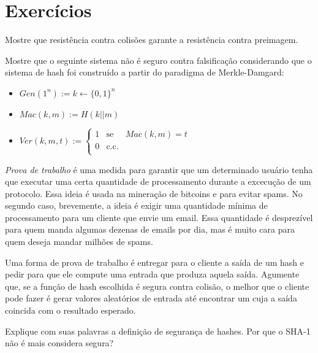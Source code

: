 \section{Exercícios}
\label{sec:exercicios}

\begin{exercicio}
  Mostre que resistência contra colisões garante a resistência contra preimagem.
\end{exercicio}

\begin{exercicio}
  Mostre que o seguinte sistema não é seguro contra falsificação considerando que o sistema de hash foi construído a partir do paradigma de Merkle-Damgard:
\begin{itemize}
\item $Gen(1^n) := k \leftarrow \{0,1\}^n$
\item $Mac(k,m) := H(k||m)$
\item $Ver(k,m,t) := \left\{
    \begin{array}{lcl}
      1 & \textrm{se} & Mac(k,m) = t\\
      0 & \textrm{c.c.} &\\
    \end{array}
    \right.$
\end{itemize}
\end{exercicio}

\begin{exercicio}
  {\em Prova de trabalho} é uma medida para garantir que um determinado usuário tenha que executar uma certa quantidade de processamento durante a excecução de um protocolo.
  Essa ideia é usada na mineração de bitcoins e para evitar spams.
  No segundo caso, brevemente, a ideia é exigir uma quantidade mínima de processamento para um cliente que envie um email.
  Essa quantidade é desprezível para quem manda algumas dezenas de emails por dia, mas é muito cara para quem deseja mandar milhões de spams.

  Uma forma de prova de trabalho é entregar para o cliente a saída de um hash e pedir para que ele compute uma entrada que produza aquela saída.
  Agumente que, se a função de hash escolhida é segura contra colisão, o melhor que o cliente pode fazer é gerar valores aleatórios de entrada até encontrar um cuja a saída coincida com o resultado esperado.
\end{exercicio}

\begin{exercicio}
  Explique com suas palavras a definição de segurança de hashes.
  Por que o SHA-1 não é mais considera segura?
\end{exercicio}
